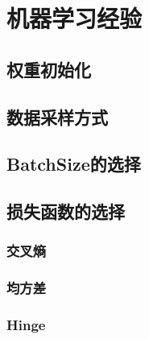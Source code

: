 \chapter{机器学习经验}

    \section{权重初始化}
    \section{数据采样方式}
    \section{BatchSize的选择}
    \section{损失函数的选择}
    \subsection{交叉熵}
    \subsection{均方差}
    \subsection{Hinge}

    